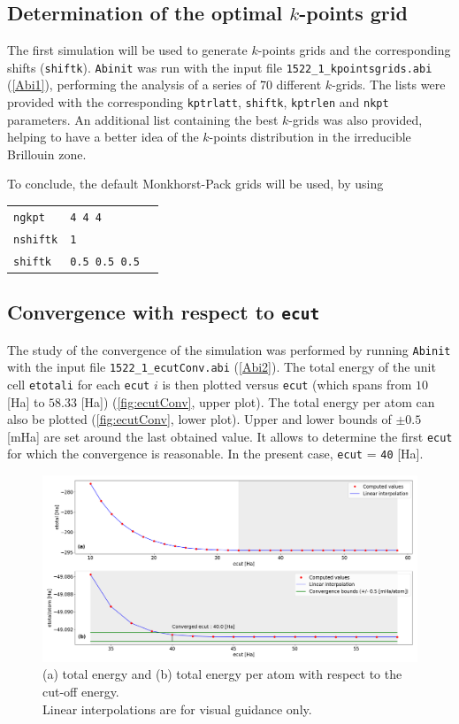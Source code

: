 \documentclass[11pt,a4paper]{article}
\begin{document}
\subsection{Determination of the optimal $k$-points grid}
The first simulation will be used to generate $k$-points grids and the corresponding shifts (\texttt{shiftk}). \texttt{Abinit} was run with the input file \texttt{1522\_1\_kpointsgrids.abi} (\autoref{Abi1}), performing the analysis of a series of 70 different $k$-grids. The lists were provided with the corresponding \texttt{kptrlatt}, \texttt{shiftk}, \texttt{kptrlen} and \texttt{nkpt} parameters. An additional list containing the best $k$-grids was also provided, helping to have a better idea of the $k$-points distribution in the irreducible Brillouin zone.

To conclude, the default Monkhorst-Pack grids will be used, by using
\begin{center}
\begin{tabular}{lll}
\texttt{ngkpt} & \texttt{4 4 4}&\\
\texttt{nshiftk} & \texttt{1} &\\
\texttt{shiftk} &\texttt{0.5 0.5 0.5}
\end{tabular}
\end{center}
\subsection{Convergence with respect to \texttt{ecut}}
The study of the convergence of the simulation was performed by running \texttt{Abinit} with the input file \texttt{1522\_1\_ecutConv.abi} (\autoref{Abi2}).
The total energy of the unit cell \texttt{etotali} for each \texttt{ecut} $i$ is then plotted versus \texttt{ecut} (which spans from $10$ [Ha] to $58.33$ [Ha]) (\autoref{fig:ecutConv}, upper plot). The total energy per atom can also be plotted (\autoref{fig:ecutConv}, lower plot). Upper and lower bounds of $\pm 0.5$ [mHa] are set around the last obtained value. It allows to determine the first \texttt{ecut} for which the convergence is reasonable. In the present case, \texttt{ecut} = \texttt{40} [Ha].
\begin{figure}[H]
\includegraphics[width=\textwidth]{images/ecutConv}
\caption{(a) total energy and (b) total energy per atom with respect to the cut-off energy.\\
Linear interpolations are for visual guidance only.}
\label{fig:ecutConv}
\end{figure}
\end{document}
